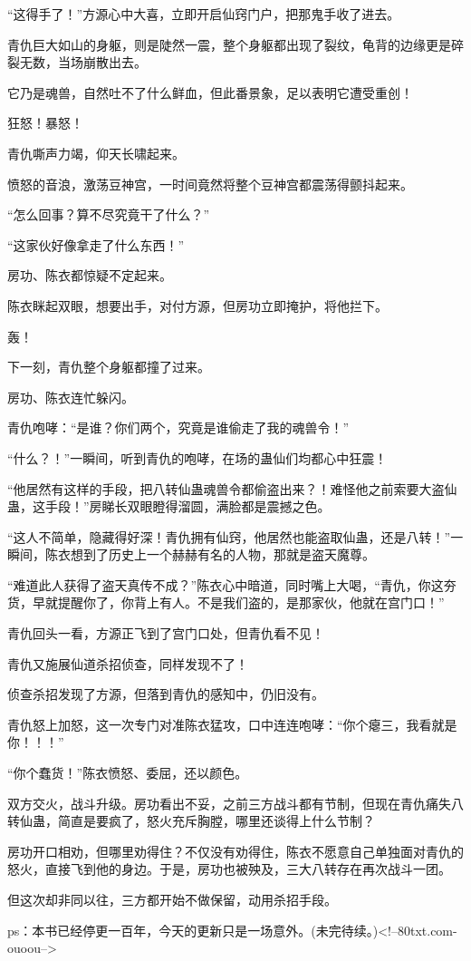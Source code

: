 \begin{this_body}
“这得手了！”方源心中大喜，立即开启仙窍门户，把那鬼手收了进去。

青仇巨大如山的身躯，则是陡然一震，整个身躯都出现了裂纹，龟背的边缘更是碎裂无数，当场崩散出去。

它乃是魂兽，自然吐不了什么鲜血，但此番景象，足以表明它遭受重创！

狂怒！暴怒！

青仇嘶声力竭，仰天长啸起来。

愤怒的音浪，激荡豆神宫，一时间竟然将整个豆神宫都震荡得颤抖起来。

“怎么回事？算不尽究竟干了什么？”

“这家伙好像拿走了什么东西！”

房功、陈衣都惊疑不定起来。

陈衣眯起双眼，想要出手，对付方源，但房功立即掩护，将他拦下。

轰！

下一刻，青仇整个身躯都撞了过来。

房功、陈衣连忙躲闪。

青仇咆哮：“是谁？你们两个，究竟是谁偷走了我的魂兽令！”

“什么？！”一瞬间，听到青仇的咆哮，在场的蛊仙们均都心中狂震！

“他居然有这样的手段，把八转仙蛊魂兽令都偷盗出来？！难怪他之前索要大盗仙蛊，这手段！”房睇长双眼瞪得溜圆，满脸都是震撼之色。

“这人不简单，隐藏得好深！青仇拥有仙窍，他居然也能盗取仙蛊，还是八转！”一瞬间，陈衣想到了历史上一个赫赫有名的人物，那就是盗天魔尊。

“难道此人获得了盗天真传不成？”陈衣心中暗道，同时嘴上大喝，“青仇，你这夯货，早就提醒你了，你背上有人。不是我们盗的，是那家伙，他就在宫门口！”

青仇回头一看，方源正飞到了宫门口处，但青仇看不见！

青仇又施展仙道杀招侦查，同样发现不了！

侦查杀招发现了方源，但落到青仇的感知中，仍旧没有。

青仇怒上加怒，这一次专门对准陈衣猛攻，口中连连咆哮：“你个瘪三，我看就是你！！！”

“你个蠢货！”陈衣愤怒、委屈，还以颜色。

双方交火，战斗升级。房功看出不妥，之前三方战斗都有节制，但现在青仇痛失八转仙蛊，简直是要疯了，怒火充斥胸膛，哪里还谈得上什么节制？

房功开口相劝，但哪里劝得住？不仅没有劝得住，陈衣不愿意自己单独面对青仇的怒火，直接飞到他的身边。于是，房功也被殃及，三大八转存在再次战斗一团。

但这次却非同以往，三方都开始不做保留，动用杀招手段。

ps：本书已经停更一百年，今天的更新只是一场意外。(未完待续。)<!--80txt.com-ouoou-->

\end{this_body}

